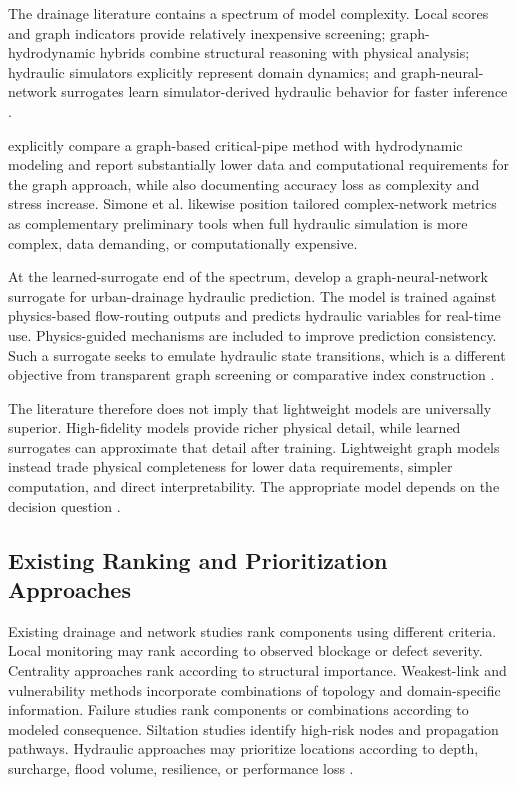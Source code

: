 The drainage literature contains a spectrum of model complexity. Local
scores and graph indicators provide relatively inexpensive screening;
graph-hydrodynamic hybrids combine structural reasoning with physical
analysis; hydraulic simulators explicitly represent domain dynamics; and
graph-neural-network surrogates learn simulator-derived hydraulic
behavior for faster inference \citep{simone2022,dastgir2023,meijer2023,
zhang2024}.

\citet{dastgir2023} explicitly compare a graph-based critical-pipe
method with hydrodynamic modeling and report substantially lower data
and computational requirements for the graph approach, while also
documenting accuracy loss as complexity and stress increase. Simone et
al. \citep{simone2022} likewise position tailored complex-network metrics as
complementary preliminary tools when full hydraulic simulation is more
complex, data demanding, or computationally expensive.

At the learned-surrogate end of the spectrum, \citet{zhang2024}
develop a graph-neural-network surrogate for urban-drainage hydraulic
prediction. The model is trained against physics-based flow-routing
outputs and predicts hydraulic variables for real-time use.
Physics-guided mechanisms are included to improve prediction
consistency. Such a surrogate seeks to emulate hydraulic state transitions,
which is a different objective from transparent graph screening or
comparative index construction \citep{zhang2024}.

The literature therefore does not imply that lightweight models are
universally superior. High-fidelity models provide richer physical
detail, while learned surrogates can approximate that detail after
training. Lightweight graph models instead trade physical completeness
for lower data requirements, simpler computation, and direct
interpretability. The appropriate model depends on the decision
question \citep{dastgir2023,simone2022,zhang2024}.

\subsection{Existing Ranking and Prioritization
Approaches}\label{existing-ranking-and-prioritization-approaches}

Existing drainage and network studies rank components using different
criteria. Local monitoring may rank according to observed blockage or
defect severity. Centrality approaches rank according to structural
importance. Weakest-link and vulnerability methods incorporate
combinations of topology and domain-specific information. Failure
studies rank components or combinations according to modeled
consequence. Siltation studies identify high-risk nodes and propagation
pathways. Hydraulic approaches may prioritize locations according to
depth, surcharge, flood volume, resilience, or performance loss
\citep{iqbal2021,vandaele2024,simone2022,dastgir2023,dastgir2024,
meijer2023,zhang2025}.


